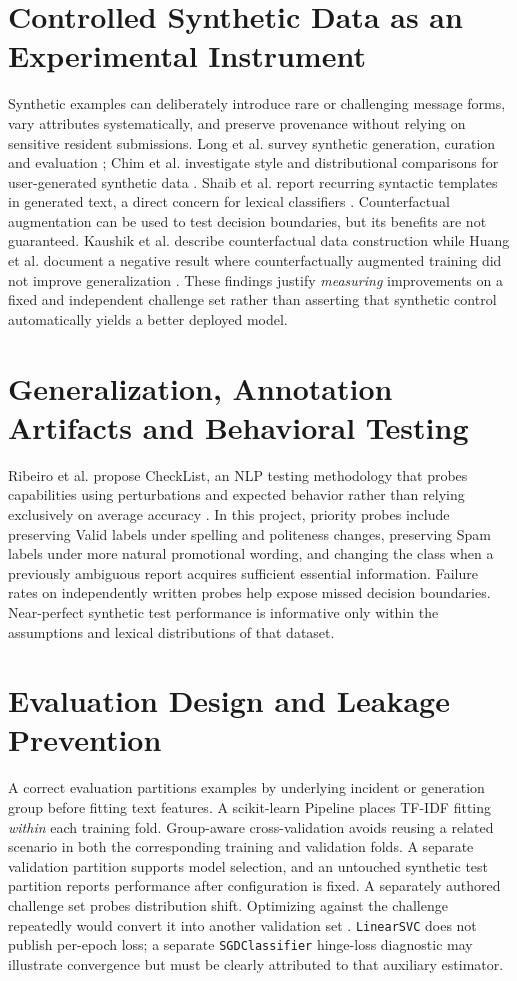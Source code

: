 \section{Controlled Synthetic Data as an Experimental Instrument}
Synthetic examples can deliberately introduce rare or challenging message forms, vary attributes systematically, and preserve provenance without relying on sensitive resident submissions. Long et al. survey synthetic generation, curation and evaluation \cite{long}; Chim et al. investigate style and distributional comparisons for user-generated synthetic data \cite{chim}. Shaib et al. report recurring syntactic templates in generated text, a direct concern for lexical classifiers \cite{shaib}. Counterfactual augmentation can be used to test decision boundaries, but its benefits are not guaranteed. Kaushik et al. describe counterfactual data construction while Huang et al. document a negative result where counterfactually augmented training did not improve generalization \cite{kaushik,huang}. These findings justify \emph{measuring} improvements on a fixed and independent challenge set rather than asserting that synthetic control automatically yields a better deployed model.

\section{Generalization, Annotation Artifacts and Behavioral Testing}
Ribeiro et al. propose CheckList, an NLP testing methodology that probes capabilities using perturbations and expected behavior rather than relying exclusively on average accuracy \cite{ribeiro}. In this project, priority probes include preserving Valid labels under spelling and politeness changes, preserving Spam labels under more natural promotional wording, and changing the class when a previously ambiguous report acquires sufficient essential information. Failure rates on independently written probes help expose missed decision boundaries. Near-perfect synthetic test performance is informative only within the assumptions and lexical distributions of that dataset.

\section{Evaluation Design and Leakage Prevention}
A correct evaluation partitions examples by underlying incident or generation group before fitting text features. A scikit-learn Pipeline places TF-IDF fitting \emph{within} each training fold. Group-aware cross-validation avoids reusing a related scenario in both the corresponding training and validation folds. A separate validation partition supports model selection, and an untouched synthetic test partition reports performance after configuration is fixed. A separately authored challenge set probes distribution shift. Optimizing against the challenge repeatedly would convert it into another validation set \cite{sklearn}. \texttt{LinearSVC} does not publish per-epoch loss; a separate \texttt{SGDClassifier} hinge-loss diagnostic may illustrate convergence but must be clearly attributed to that auxiliary estimator.

